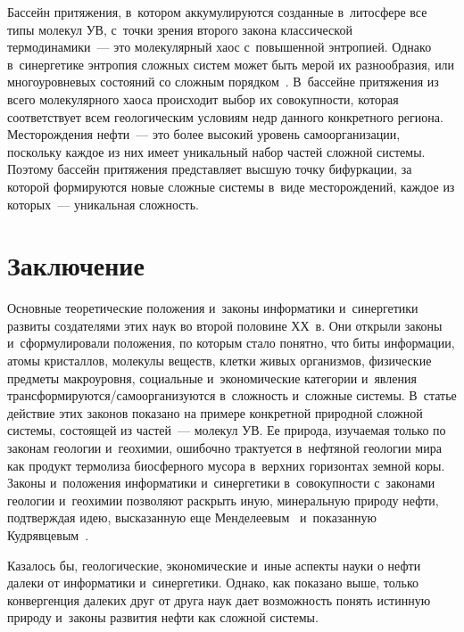 \begin{multicols}{2}
    Бассейн притяжения, в~котором аккумулируются созданные в~литосфере все 
типы молекул УВ, с~точки зрения второго закона классической  
термодинамики~--- это молекулярный хаос с~повышенной энтропией. Однако 
в~синергетике энтропия сложных систем может быть мерой их разнообразия, или 
многоуровневых состояний со сложным порядком~\cite[с.~79--80]{12-s}. 
В~бассейне притяжения из всего молекулярного хаоса происходит выбор их 
совокупности, которая соответствует всем геологическим условиям недр данного 
конкретного региона. Месторождения нефти~--- это более высокий уровень 
самоорганизации, поскольку каждое из них имеет уникальный набор частей 
сложной системы. Поэтому бассейн притяжения представляет высшую точку 
бифуркации, за которой формируются новые сложные сис\-те\-мы в~виде 
месторождений, каждое из которых~--- уникальная сложность.

\vspace*{-6pt}
    
\section{Заключение}

    Основные теоретические положения и~законы информатики и~синергетики 
развиты создателями этих наук во второй половине ХХ~в. Они открыли 
законы и~сформулировали положения, по которым стало понятно, что биты 
информации, атомы кристаллов, молекулы веществ, клетки живых организмов, 
физические предметы макроуровня, социальные и~экономические категории 
и~явления трансформируются/самоорганизуются в~сложность и~сложные системы. 
В~статье действие этих законов показано на примере конкретной природной 
сложной системы, состоящей из частей~--- молекул УВ. Ее природа, изучаемая 
только по законам геологии и~геохимии, ошибочно трактуется в~нефтяной 
геологии мира как продукт термолиза биосферного мусора в~верхних горизонтах 
земной коры. Законы и~положения информатики и~синергетики в~совокупности 
с~законами геологии и~геохимии позволяют раскрыть иную, минеральную 
природу нефти, подтверждая идею, высказанную еще Менделеевым~\cite{14-s} 
и~показанную Кудрявцевым~\cite{15-s}. 
    
    Казалось бы, геологические, экономические и~иные аспекты науки о нефти 
далеки от информатики и~синергетики. Однако, как показано выше, только 
конвергенция далеких друг от друга наук дает возможность понять истинную 
природу и~законы развития нефти как сложной системы. 
    

\end{multicols}
